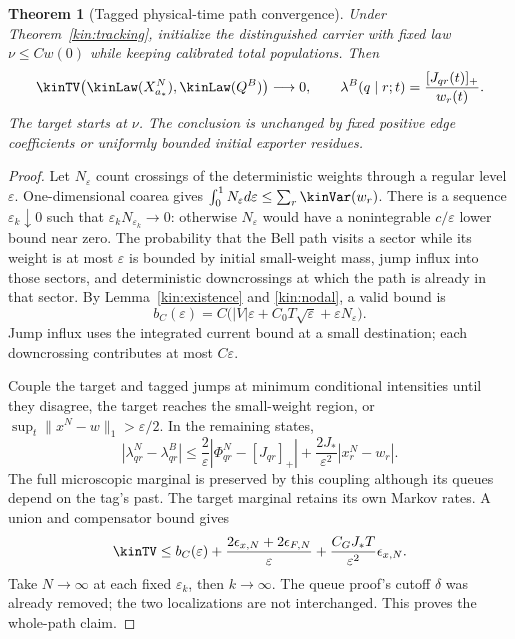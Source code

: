 \documentclass[11pt,oneside,openany]{book}
\newtheorem{theorem}{Theorem}[chapter]
\theoremstyle{definition}
\theoremstyle{remark}\newtheorem{remark}[theorem]{Remark}
\begin{document}
\begin{theorem}[Tagged physical-time path convergence]\label{kin:path}
Under Theorem~\ref{kin:tracking}, initialize the distinguished carrier
with fixed law $\nu\le Cw(0)$ while keeping calibrated total populations.
Then
\begin{equation}
 \kinTV\bigl(\kinLaw(X_{a_*}^N),\kinLaw(Q^B)\bigr)\longrightarrow0,
 \qquad \lambda^B(q\mid r;t)=\frac{[J_{qr}(t)]_+}{w_r(t)}.
 \label{kin:Belllimit}
\end{equation}
The target starts at $\nu$. The conclusion is unchanged by fixed positive
edge coefficients or uniformly bounded initial exporter residues.
\end{theorem}
\begin{proof}
Let $N_\varepsilon$ count crossings of the deterministic weights through
a regular level $\varepsilon$. One-dimensional coarea gives
$\int_0^1N_\varepsilon d\varepsilon\le\sum_r\kinVar(w_r)$.
There is a sequence $\varepsilon_k\downarrow0$ such that
$\varepsilon_kN_{\varepsilon_k}\to0$: otherwise $N_\varepsilon$ would
have a nonintegrable $c/\varepsilon$ lower bound near zero.
The probability that the Bell path visits a sector while its weight is
at most $\varepsilon$ is bounded by initial small-weight mass, jump
influx into those sectors, and deterministic downcrossings at which the
path is already in that sector. By Lemma~\ref{kin:existence} and
\eqref{kin:nodal}, a valid bound is
\begin{equation}
 b_C(\varepsilon)=C\bigl(|V|\varepsilon+
 C_0T\sqrt\varepsilon+\varepsilon N_\varepsilon\bigr).
 \label{kin:nodebudget}
\end{equation}
Jump influx uses the integrated current bound at a small destination;
each downcrossing contributes at most $C\varepsilon$.

Couple the target and tagged jumps at minimum conditional intensities
until they disagree, the target reaches the small-weight region, or
$\sup_t\|x^N-w\|_1>\varepsilon/2$. In the remaining states,
\[
 |\lambda^N_{qr}-\lambda^B_{qr}|
 \le\frac2\varepsilon|\Phi^N_{qr}-[J_{qr}]_+|
 +\frac{2J_*}{\varepsilon^2}|x_r^N-w_r|.
\]
The full microscopic marginal is preserved by this coupling although its
queues depend on the tag's past. The target marginal retains its own
Markov rates. A union and compensator bound gives
\begin{equation}
 \kinTV\le b_C(\varepsilon)
 +\frac{2\epsilon_{x,N}+2\epsilon_{F,N}}{\varepsilon}
 +\frac{C_GJ_*T}{\varepsilon^2}\epsilon_{x,N}.
 \label{kin:pathbound}
\end{equation}
Take $N\to\infty$ at each fixed $\varepsilon_k$, then $k\to\infty$.
The queue proof's cutoff $\delta$ was already removed; the two
localizations are not interchanged. This proves the whole-path claim.
\end{proof}
\end{document}
